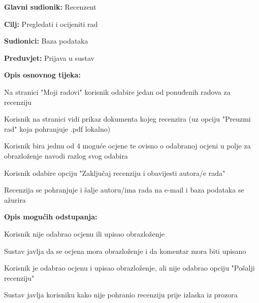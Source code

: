				
					\noindent {}
					\begin{packed_item}
						
						\item \textbf{Glavni sudionik:} Recenzent
						\item \textbf{Cilj:} Pregledati i ocijeniti rad
						\item \textbf{Sudionici:} Baza podataka
						\item \textbf{Preduvjet:} Prijava u sustav
						\item \textbf{Opis osnovnog tijeka:} 
						
						\item[] \begin{packed_enum}
							\item Na stranici "Moji radovi" korisnik odabire jedan od ponuđenih radova za recenziju
							\item  Korisnik na stranici vidi prikaz dokumenta kojeg recenzira (uz opciju "Preuzmi rad" koja pohranjuje .pdf lokalno)
							\item Korisnik bira jednu od 4 moguće ocjene te ovisno o odabranoj ocjeni u polje za obrazloženje navodi razlog svog odabira
							\item Korisnik odabire opciju "Zaključaj recenziju i obavijesti autora/e rada"
							\item Recenzija se pohranjuje i šalje autoru/ima rada na e-mail i baza podataka se ažurira
						\end{packed_enum}
					
						\item \textbf{Opis mogućih odstupanja:}
						
						\item[] \begin{packed_enum}
							\item[3.a] Korisnik nije odabrao ocjenu ili upisao obrazloženje
							\item[] \begin{packed_enum}
								\item[1.] Sustav javlja da se ocjena mora obrazloženje i da komentar mora biti upisano
							\end{packed_enum}
							\item[3.b] Korisnik je odabrao ocjenu i upisao obrazloženje, ali nije odabrao opciju "Pošalji recenziju"
							\item[] \begin{packed_enum}
								\item[1.] Sustav javlja korisniku kako nije pohranio recenziju prije izlaska iz prozora
							\end{packed_enum}
						\end{packed_enum}
					
					\end{packed_item}
				
